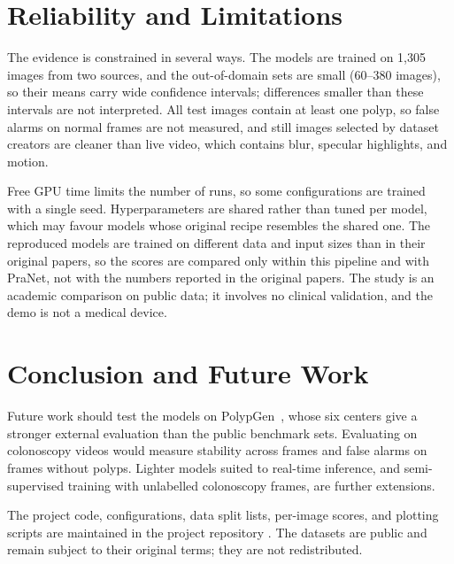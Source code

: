 \documentclass[10pt,twoside]{article}
\begin{document}
\section{Reliability and Limitations}\label{sec:limits}
The evidence is constrained in several ways. The models are trained on 1,305 images
from two sources, and the out-of-domain sets are small (60--380 images), so their means
carry wide confidence intervals; differences smaller than these intervals are not
interpreted. All test images contain at least one polyp, so false alarms on normal
frames are not measured, and still images selected by dataset creators are cleaner than
live video, which contains blur, specular highlights, and motion.

Free GPU time limits the number of runs, so some configurations are trained with a single
seed. Hyperparameters are shared rather than tuned per model, which may favour models
whose original recipe resembles the shared one. The reproduced models are trained on
different data and input sizes than in their original papers, so the scores are compared
only within this pipeline and with PraNet, not with the numbers reported in the original
papers. The study is an academic comparison on public data; it involves no clinical
validation, and the demo is not a medical device.

\section{Conclusion and Future Work}\label{sec:conclusion}

Future work should test the models on PolypGen~\cite{ali2023polypgen}, whose six centers
give a stronger external evaluation than the public benchmark sets. Evaluating on
colonoscopy videos would measure stability across frames and false alarms on frames
without polyps. Lighter models suited to real-time inference, and semi-supervised
training with unlabelled colonoscopy frames, are further extensions.

 The project code, configurations, data split lists,
per-image scores, and plotting scripts are maintained in the project repository
\ph{[URL]}. The datasets are public and remain subject to their original terms; they are
not redistributed.
\end{document}

